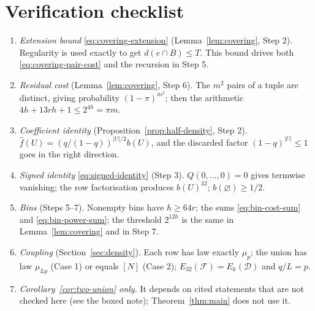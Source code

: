 \documentclass[11pt,letterpaper]{article}
\theoremstyle{definition}
\theoremstyle{remark}
\numberwithin{equation}{section}
\begin{document}
\section{Verification checklist}

\begin{enumerate}
\item \emph{Extension bound} \eqref{eq:covering-extension}
(Lemma~\ref{lem:covering}, Step 2). Regularity is used exactly to get
$d(e\cap B)\le T$. This bound drives both
\eqref{eq:covering-pair-cost} and the recursion in Step 5.
\item \emph{Residual cost} (Lemma~\ref{lem:covering}, Step 6). The $m^2$
pairs of a tuple are distinct, giving probability $(1-\pi)^{m^2}$; then
the arithmetic $4h+13rh+1\le2^{4h}=\pi m$.
\item \emph{Coefficient identity}
(Proposition~\ref{prop:half-density}, Step 2).
$\widehat f(U)=(q/(1-q))^{|U|/2}b(U)$, and the discarded factor
$(1-q)^{|U|}\le1$ goes in the right direction.
\item \emph{Signed identity} \eqref{eq:signed-identity} (Step 3).
$Q(0,\ldots,0)=0$ gives termwise vanishing; the row factorisation
produces $b(U)^{32}$; $b(\varnothing)\ge1/2$.
\item \emph{Bins} (Steps 5--7). Nonempty bins have $h\ge64r$; the sums
\eqref{eq:bin-cost-sum} and \eqref{eq:bin-power-sum}; the threshold
$2^{12h}$ is the same in Lemma~\ref{lem:covering} and in Step 7.
\item \emph{Coupling} (Section~\ref{sec:density}). Each row has law
exactly $\mu_p$; the union has law $\mu_{Lp}$ (Case 1) or equals $[N]$
(Case 2); $E_{32}(\mathcal F)=E_k(\mathcal D)$ and $q/L=p$.
\item \emph{Corollary~\ref{cor:two-union} only.} It depends on cited
statements that are not checked here (see the boxed note);
Theorem~\ref{thm:main} does not use it.
\end{enumerate}
\end{document}

